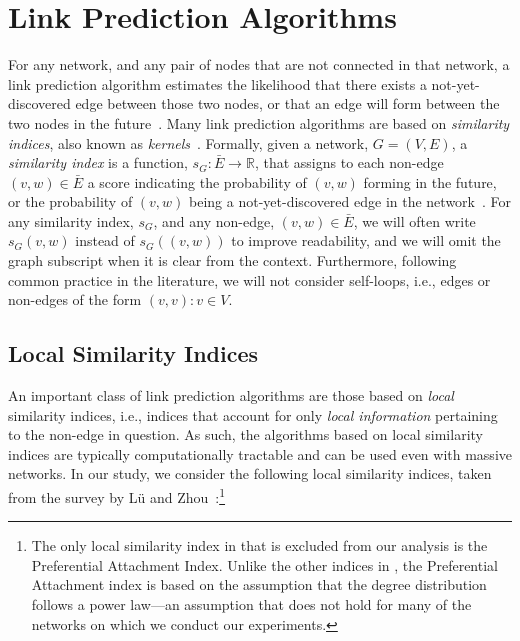 \documentclass[twocolumn]{article}
\newcommand{\R}{\mathbb{R}}
\newcommand{\ER}{\bar{E}}
\begin{document}
\newpage


\section{Link Prediction Algorithms}\label{sec:linkPredictionAlgorithms}

\noindent For any network, and any pair of nodes that are not connected in that network, a link prediction algorithm estimates the likelihood that there exists a not-yet-discovered edge between those two nodes, or that an edge will form between the two nodes in the future~\cite{getoor2005link}.
Many link prediction algorithms are based on \textit{similarity indices}, also known as \textit{kernels}~\cite{shawe2004kernel}. 
Formally, given a network, $G=(V,E)$, a \textit{similarity index} is a function, $s_G: \ER \rightarrow \R$, that assigns to each non-edge $(v,w)\in\ER$ a score indicating the probability of $(v,w)$ forming in the future, or the probability of $(v,w)$ being a not-yet-discovered edge in the network~\cite{getoor2005link}. For any similarity index, $s_G$, and any non-edge, $(v,w)\in\ER$, we will often write $s_G(v,w)$ instead of $s_G((v,w))$ to improve readability, and we will omit the graph subscript when it is clear from the context. Furthermore, following common practice in the literature, we will not consider self-loops, i.e., edges or non-edges of the form $(v,v):v\in V$.

\subsection{Local Similarity Indices}\label{sec:linkPredictionAlgorithms:local}
\noindent An important class of link prediction algorithms are those based on \textit{local} similarity indices, i.e., indices that account for only \emph{local information} pertaining to the non-edge in question.
As such, the algorithms based on local similarity indices are typically computationally tractable and can be used even with massive networks. In our study, we consider the following local similarity indices, taken from the survey by L{\"u} and Zhou~\cite{lu2011link}:\footnote{\footnotesize The only local similarity index in \cite{lu2011link} that is excluded from our analysis is the Preferential Attachment Index. Unlike the other indices in \cite{lu2011link}, the Preferential Attachment index is based on the assumption that the degree distribution follows a power law---an assumption that does not hold for many of the networks on which we conduct our experiments.}
\end{document}
